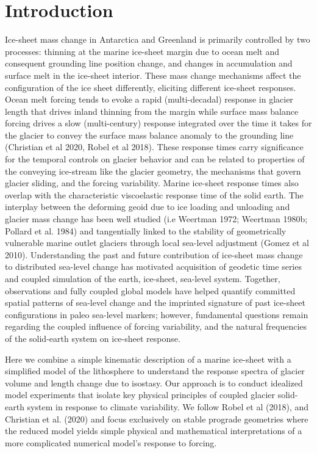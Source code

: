 \documentclass[tc, manuscript]{copernicus}
\begin{document}
\section{Introduction} 
Ice-sheet mass change in Antarctica and Greenland is primarily controlled by two processes: thinning at the marine ice-sheet margin due to ocean melt and consequent grounding line position change, and changes in accumulation and surface melt in the ice-sheet interior. 
These mass change mechanisms affect the configuration of the ice sheet differently, eliciting different ice-sheet responses. 
Ocean melt forcing tends to evoke a rapid (multi-decadal) response in glacier length that drives inland thinning from the margin while surface mass balance forcing drives a slow (multi-century) response integrated over the time it takes for the glacier to convey the surface mass balance anomaly to the grounding line (Christian et al 2020, Robel et al 2018).
These response times carry significance for the temporal controls on glacier behavior and can be related to properties of the conveying ice-stream like the glacier geometry, the mechanisms that govern glacier sliding, and the forcing variability.
Marine ice-sheet response times also overlap with the characteristic viscoelastic response time of the solid earth.
The interplay between the deforming geoid due to ice loading and unloading and glacier mass change has been well studied (i.e Weertman 1972; Weertman 1980b; Pollard et al. 1984) and tangentially linked to the stability of geometrically vulnerable marine outlet glaciers through local sea-level adjustment (Gomez et al 2010). 
Understanding the past and future contribution of ice-sheet mass change to distributed sea-level change has motivated acquisition of geodetic time series and coupled simulation of the earth, ice-sheet, sea-level system. 
Together, observations and fully coupled global models have helped quantify committed spatial patterns of sea-level change and the imprinted signature of past ice-sheet configurations in paleo sea-level markers; however, fundamental questions remain regarding the coupled influence of forcing variability, and the natural frequencies of the solid-earth system on ice-sheet response.

Here we combine a simple kinematic description of a marine ice-sheet with a simplified model of the lithosphere to understand the response spectra of glacier volume and length change due to isostasy. 
Our approach is to conduct idealized model experiments that isolate key physical principles of coupled glacier solid-earth system in response to climate variability. 
We follow Robel et al (2018), and Christian et al. (2020) and focus exclusively on stable prograde geometries where the reduced model yields simple physical and mathematical interpretations of a more complicated numerical model’s response to forcing.
\end{document}
